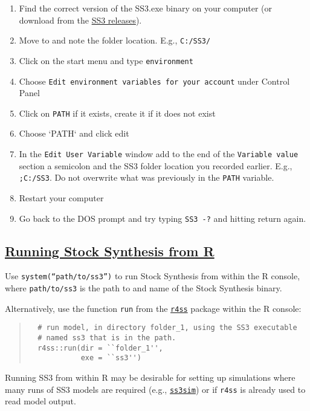 \begin{enumerate}
  \item Find the correct version of the SS3.exe binary on your computer (or download from the \href{https://github.com/nmfs-ost/ss3-source-code/releases}{SS3 releases}).
  \item Move to and note the folder location. E.g., \texttt{C:/SS3/}
  \item Click on the start menu and type \texttt{environment}
  \item Choose \texttt{Edit environment variables for your account} under Control Panel
  \item Click on \texttt{PATH} if it exists, create it if it does not exist 
  \item Choose `PATH` and click edit
  \item In the \texttt{Edit User Variable} window add to the end of the \texttt{Variable value} section a semicolon and the SS3 folder location you recorded earlier.
     E.g., \texttt{;C:/SS3}. Do not overwrite what was previously in the \texttt{PATH} variable.
  \item Restart your computer
  \item Go back to the DOS prompt and try typing \texttt{SS3 -?} and hitting return again.
\end{enumerate}

\hypertarget{SS3inR}{}
\subsection[Running Stock Synthesis from R]{\protect\hyperlink{SS3inR}{Running Stock Synthesis from R}}
Use \texttt{system(``path/to/ss3'')} to run Stock Synthesis from within the R console, where \texttt{path/to/ss3} is the path to and name of the Stock Synthesis binary.

Alternatively, use the function \texttt{run} from the \href{https://r4ss.github.io/r4ss/index.html}{\texttt{r4ss}} package within the R console:

\begin{quote}
  \begin{verbatim}
  # run model, in directory folder_1, using the SS3 executable
  # named ss3 that is in the path.
  r4ss::run(dir = ``folder_1'',
            exe = ``ss3'')
  \end{verbatim}
\end{quote}



Running SS3 from within R may be desirable for setting up simulations where many runs of SS3 models are required (e.g., \href{https://github.com/ss3sim/ss3sim}{\texttt{ss3sim}}) or if \texttt{r4ss} is already used to read model output.

